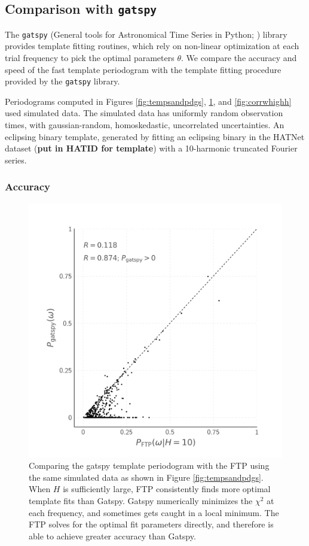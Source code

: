 \documentclass[iop]{emulateapj}
\newcommand{\todo}[1]{{\bf #1}}
\begin{document}
\subsection{Comparison with \texttt{gatspy}}

The \texttt{gatspy} (General tools for Astronomical Time Series in Python; 
\cite{gatspy,Vanderplas+Ivezic_2015}) library provides template fitting
routines, which rely on non-linear optimization at each trial frequency
to pick the optimal parameters $\theta$. We compare the accuracy and
speed of the fast template periodogram with the template fitting
procedure provided by the \texttt{gatspy} library.

Periodograms computed in Figures \ref{fig:tempsandpdgs}, \ref{fig:corrwgats},
and \ref{fig:corrwhighh} used simulated data. The simulated data has uniformly
random observation times, with gaussian-random, homoskedastic, uncorrelated 
uncertainties. An eclipsing binary template, generated by fitting an
eclipsing binary in the HATNet dataset (\todo{put in HATID for template})
with a 10-harmonic truncated Fourier series.

\subsubsection{Accuracy}

\begin{figure}
    \centering
    \includegraphics[width=\textwidth]{plots/correlation_with_gatspy.png}
    \caption{\label{fig:corrwgats} Comparing the gatspy template periodogram with 
            the FTP using the same simulated data as shown in Figure \ref{fig:tempsandpdgs}.
            When $H$ is sufficiently large, FTP consistently finds more optimal template
            fits than Gatspy. Gatspy numerically minimizes the $\chi^2$ at each frequency,
            and sometimes gets caught in a local minimum. The FTP solves for the optimal
            fit parameters directly, and therefore is able to achieve greater accuracy than Gatspy.}
\end{figure}
\end{document}

